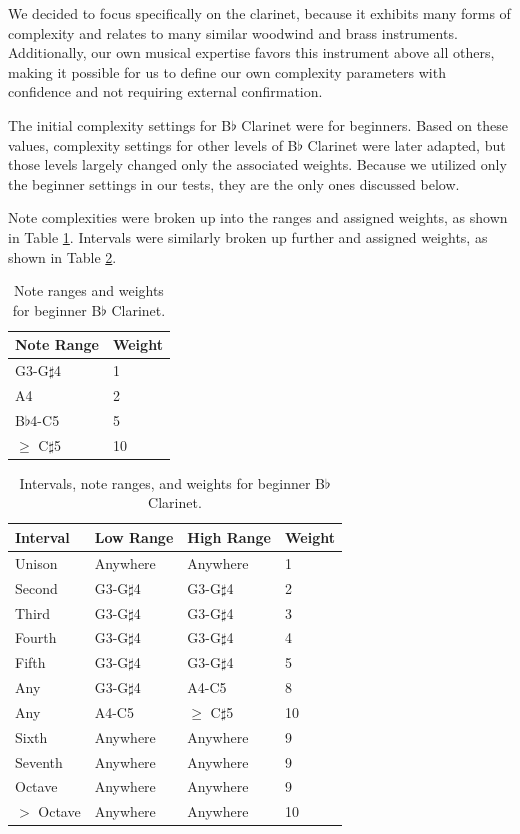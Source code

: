 \documentclass[12pt]{report}
\begin{document}
We decided to focus specifically on the clarinet, because it exhibits many forms of complexity and relates to many similar woodwind and brass instruments. Additionally, our own musical expertise favors this instrument above all others, making it possible for us to define our own complexity parameters with confidence and not requiring external confirmation.

The initial complexity settings for B$\flat$ Clarinet were for beginners. Based on these values, complexity settings for other levels of B$\flat$ Clarinet were later adapted, but those levels largely changed only the associated weights. Because we utilized only the beginner settings in our tests, they are the only ones discussed below.

Note complexities were broken up into the ranges and assigned weights, as shown in Table \ref{table:notes}. Intervals were similarly broken up further and assigned weights, as shown in Table \ref{table:intervals}.  

\begin{table}[t]
	\centering
	\caption{Note ranges and weights for beginner B$\flat$ Clarinet.}
    \begin{tabular}{| l | l |}
        \hline
        Note Range & Weight \\ \hline
        G3-G$\sharp$4 & 1 \\ \hline
        A4 & 2 \\ \hline
        B$\flat$4-C5 & 5 \\ \hline
        $\geq$ C$\sharp$5 & 10 \\
        \hline
    \end{tabular}
	\label{table:notes}
\end{table}

\begin{table}[t]
	\centering
	\caption{Intervals, note ranges, and weights for beginner B$\flat$ Clarinet.}
    \begin{tabular}{| l | l | l | l |}
        \hline
        Interval & Low Range & High Range & Weight \\ \hline
        Unison & Anywhere & Anywhere & 1 \\ \hline
        Second & G3-G$\sharp$4 & G3-G$\sharp$4 & 2 \\ \hline
        Third & G3-G$\sharp$4 & G3-G$\sharp$4 & 3 \\ \hline
        Fourth & G3-G$\sharp$4 & G3-G$\sharp$4 & 4 \\ \hline
        Fifth & G3-G$\sharp$4 & G3-G$\sharp$4 & 5 \\ \hline
        Any & G3-G$\sharp$4 & A4-C5 & 8 \\ \hline
        Any & A4-C5 & $\geq$ C$\sharp$5 & 10 \\ \hline
        Sixth & Anywhere & Anywhere & 9 \\ \hline
        Seventh & Anywhere & Anywhere & 9 \\ \hline
        Octave & Anywhere & Anywhere & 9 \\ \hline
        $>$ Octave & Anywhere & Anywhere & 10 \\
        \hline
    \end{tabular}
	\label{table:intervals}
\end{table}
\end{document}
